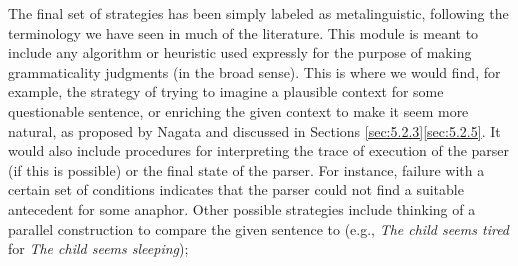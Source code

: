 The final set of strategies has been simply labeled as metalinguistic, following the terminology we have seen in much of the literature. This module is meant to include any algorithm or heuristic used expressly for the purpose of making grammaticality judgments (in the broad sense). This is where we would find, for example, the strategy of trying to imagine a plausible context for some questionable sentence, or enriching the given context to make it seem more natural, as proposed by Nagata and discussed in Sections \ref{sec:5.2.3}\textendash{}\ref{sec:5.2.5}.
It would also include procedures for interpreting the trace of execution of the parser (if this is possible) or the final state of the parser. For instance, failure with a certain set of conditions indicates that the parser could not find a suitable antecedent for some anaphor. Other possible strategies include thinking of a parallel construction to compare the given sentence to (e.g., \textit{The child seems tired} for \textit{The child seems sleeping});
